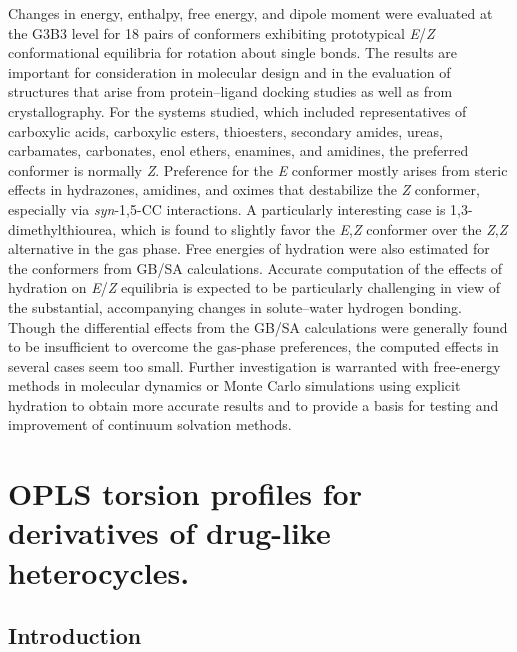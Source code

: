 \documentclass[12pt]{report}
\begin{document}
Changes in energy, enthalpy, free energy, and dipole moment were evaluated at the G3B3 level for 18 pairs of conformers exhibiting prototypical \textit{E}/\textit{Z} conformational equilibria for rotation about single bonds. The results are important for consideration in molecular design and in the evaluation of structures that arise from protein--ligand docking studies as well as from crystallography. For the systems studied, which included representatives of carboxylic acids, carboxylic esters, thioesters, secondary amides, ureas, carbamates, carbonates, enol ethers, enamines, and amidines, the preferred conformer is normally \textit{Z}. Preference for the \textit{E} conformer mostly arises from steric effects in hydrazones, amidines, and oximes that destabilize the \textit{Z} conformer, especially via \textit{syn}-1,5-CC interactions. A particularly interesting case is 1,3-dimethylthiourea, which is found to slightly favor the \textit{E},\textit{Z} conformer over the \textit{Z},\textit{Z} alternative in the gas phase. Free energies of hydration were also estimated for the conformers from GB/SA calculations. Accurate computation of the effects of hydration on \textit{E}/\textit{Z} equilibria is expected to be particularly challenging in view of the substantial, accompanying changes in solute--water hydrogen bonding. Though the differential effects from the GB/SA calculations were generally found to be insufficient to overcome the gas-phase preferences, the computed effects in several cases seem too small. Further investigation is warranted with free-energy methods in molecular dynamics or Monte Carlo simulations using explicit hydration to obtain more accurate results and to provide a basis for testing and improvement of continuum solvation methods.


\chapter{OPLS torsion profiles for derivatives of drug-like heterocycles.}
\label{ch-dih}

\section{Introduction}
\end{document}
